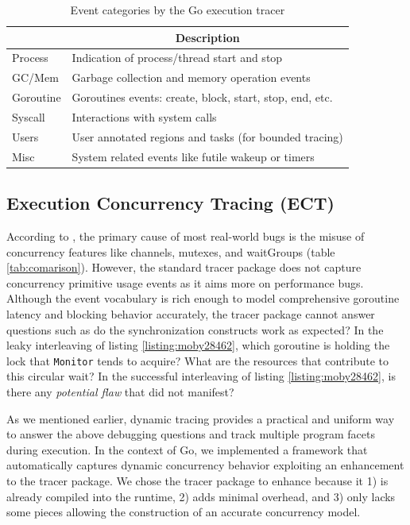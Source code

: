 \begin{table}[]
    \centering
        \begin{tabular}{|l|l|}
        \hline
        \rowcolor[HTML]{C0C0C0}
        \multicolumn{1}{|c|}{\cellcolor[HTML]{C0C0C0}\textbf{Category}} & \multicolumn{1}{c|}{\cellcolor[HTML]{C0C0C0}\textbf{Description}} \\ \hline
        Process & Indication of process/thread start and stop \\ \hline
        GC/Mem & Garbage collection and memory operation events\\ \hline
        Goroutine & Goroutines events: create, block, start, stop, end, etc. \\ \hline
        Syscall & Interactions with system calls \\ \hline
        Users & User annotated regions and tasks (for bounded tracing) \\ \hline
        Misc & System related events like futile wakeup or timers \\ \hline
        \end{tabular}

    \caption{Event categories by the Go execution tracer}
    \label{tab:events}
\end{table}




\subsection{Execution Concurrency Tracing (ECT)}
\label{sec:ect}
According to \cite{tu-concurrentBugs-asplos19,yuan-gobench-cgo21}, the primary cause of most real-world bugs is the misuse of concurrency features like channels, mutexes, and waitGroups (table \ref{tab:comarison}).
%
However, the standard tracer package does not capture concurrency primitive usage events as it aims more on performance bugs.
%
Although the event vocabulary is rich enough to model comprehensive goroutine latency and blocking behavior accurately, the tracer package cannot answer questions such as do the synchronization constructs work as expected? In the leaky interleaving of listing \ref{listing:moby28462}, which goroutine is holding the lock that \texttt{Monitor} tends to acquire? What are the resources that contribute to this circular wait? In the successful interleaving of listing \ref{listing:moby28462}, is there any \textit{potential flaw} that did not manifest?

%
As we mentioned earlier, dynamic tracing provides a practical and uniform way to answer the above debugging questions and track multiple program facets during execution.
%
In the context of Go, we implemented a framework that automatically captures dynamic concurrency behavior exploiting an enhancement to the tracer package.
%
We chose the tracer package to enhance because it 1) is already compiled into the runtime, 2) adds minimal overhead, and 3) only lacks some pieces allowing the construction of an accurate concurrency model.
%

